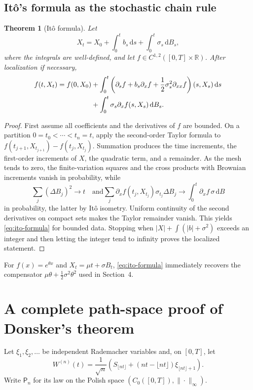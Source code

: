 \documentclass[10pt,a4paper]{article}
\numberwithin{equation}{section}
\theoremstyle{blueplain}
\newtheorem{theorem}{Theorem}[section]
\theoremstyle{definition}
\newcommand{\R}{\mathbb R}
\newcommand{\dd}{\,\mathrm d}
\begin{document}
\subsection{It\^o's formula as the stochastic chain rule}

\begin{theorem}[It\^o formula]
Let
\[
  X_t=X_0+\int_0^t b_s\dd s+\int_0^t\sigma_s\dd B_s,
\]
where the integrals are well-defined, and let
\(f\in C^{1,2}([0,T]\times\R)\).  After localization if necessary,
\begin{align}
 f(t,X_t)=f(0,X_0)
 &+\int_0^t
   \left(\partial_sf+b_s\partial_xf
   +\frac12\sigma_s^2\partial_{xx}f\right)(s,X_s)\dd s
 \notag\\
 &+\int_0^t\sigma_s\partial_xf(s,X_s)\dd B_s.
 \label{eq:ito-formula}
\end{align}
\end{theorem}

\begin{proof}
First assume all coefficients and the derivatives of \(f\) are bounded.  On a
partition \(0=t_0<\cdots<t_n=t\), apply the second-order Taylor formula to
\(f(t_{j+1},X_{t_{j+1}})-f(t_j,X_{t_j})\).  Summation produces the time
increments, the first-order increments of \(X\), the quadratic term, and a
remainder.  As the mesh tends to zero, the finite-variation squares and the
cross products with Brownian increments vanish in probability, while
\[
  \sum_j(\Delta B_j)^2\longrightarrow t
  \quad\text{and}
  \sum_j\partial_xf(t_j,X_{t_j})\sigma_{t_j}\Delta B_j
  \longrightarrow\int_0^t\partial_xf\,\sigma\dd B
\]
in probability, the latter by It\^o isometry.  Uniform continuity of the second
derivatives on compact sets makes the Taylor remainder vanish.  This yields
\eqref{eq:ito-formula} for bounded data.  Stopping when
\(|X|+\int(|b|+\sigma^2)\) exceeds an integer and then letting the integer tend
to infinity proves the localized statement.
\end{proof}

For \(f(x)=e^{\theta x}\) and \(X_t=\mu t+\sigma B_t\),
\eqref{eq:ito-formula} immediately recovers the compensator
\(\mu\theta+\tfrac12\sigma^2\theta^2\) used in Section~4.

\clearpage
\section{A complete path-space proof of Donsker's theorem}
\label{sec:donsker-proof}

Let \(\xi_1,\xi_2,\ldots\) be independent Rademacher variables and, on
\([0,T]\), let
\begin{equation}
 W^{(n)}(t)=\frac1{\sqrt n}\left(
 S_{\lfloor nt\rfloor}
 +(nt-\lfloor nt\rfloor)\xi_{\lfloor nt\rfloor+1}
 \right).
 \label{eq:donsker-repeated}
\end{equation}
Write \(\mathsf P_n\) for its law on the Polish space
\((C_0([0,T]),\|\cdot\|_\infty)\).
\end{document}
